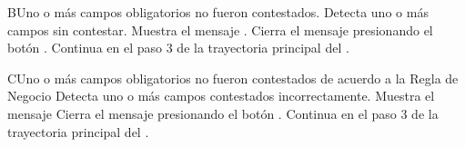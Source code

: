 \begin{UCtrayectoriaA}{B}{Uno o más campos obligatorios no fueron contestados.}
\UCpaso Detecta uno o más campos sin contestar.
\UCpaso Muestra el mensaje .
\UCpaso[\UCactor] Cierra el mensaje presionando el botón .
\UCpaso Continua en el paso 3 de la trayectoria principal del .
\end{UCtrayectoriaA}


\begin{UCtrayectoriaA}{C}{Uno o más campos obligatorios no fueron contestados de acuerdo a la Regla de Negocio} %
\UCpaso Detecta uno o más campos contestados incorrectamente.
\UCpaso Muestra el mensaje 
\UCpaso[\UCactor] Cierra el mensaje presionando el botón .
\UCpaso Continua en el paso 3 de la trayectoria principal del .
\end{UCtrayectoriaA}